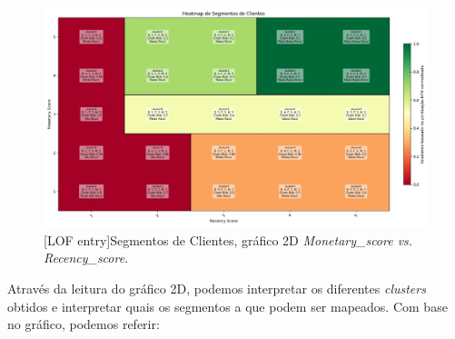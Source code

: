 \documentclass{easychair}
\begin{document}
\begin{figure}[H]
    \begin{centering}
    \includegraphics[width=0.8\linewidth]{imagens/figure28.jpg}\label{cap-5-fig28}
    [LOF entry]{Segmentos de Clientes, gráfico 2D \textit{Monetary_score vs. Recency_score}.}
    \label{fig28}
    \end{centering}
\end{figure}

Através da leitura do gráfico 2D, podemos interpretar os diferentes \textit{clusters} obtidos e interpretar quais os segmentos a que podem ser mapeados. Com base no gráfico, podemos referir:
\end{document}
